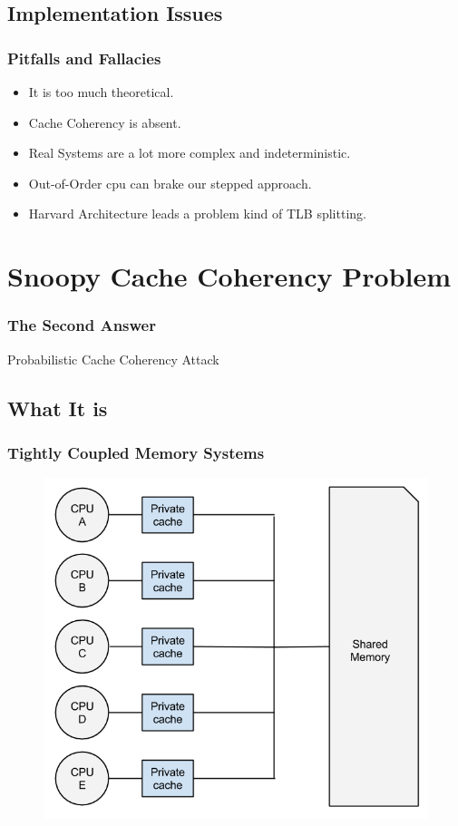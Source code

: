 \documentclass{beamer}
\begin{document}
\subsection{Implementation Issues}
\begin{frame}
	\frametitle{Pitfalls and Fallacies}
	\begin{itemize}
		\item It is too much theoretical.
		\item Cache Coherency is absent.
		\item Real Systems are a lot more complex and indeterministic.
		\item Out-of-Order cpu can brake our stepped approach.
		\item Harvard Architecture leads a problem kind of TLB splitting.
	\end{itemize}
\end{frame}







\section{Snoopy Cache Coherency Problem}
\begin{frame}
	\frametitle{The Second Answer}
	\huge{\centerline{Probabilistic Cache Coherency Attack}}
\end{frame}

\subsection{What It is}
\begin{frame}
	\frametitle{Tightly Coupled Memory Systems}
		\begin{figure}
			\includegraphics[width=0.6\linewidth]{img/tightly_coupled_memories.png}
		\end{figure}
\end{frame}
\end{document}
